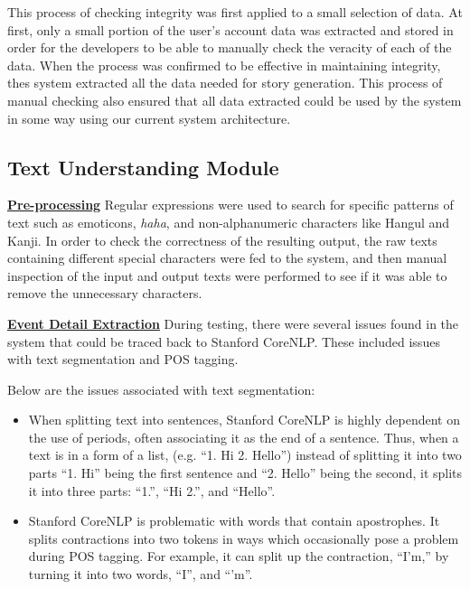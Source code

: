 This process of checking integrity was first applied to a small selection of data. At first, only a small portion of the user's account data was extracted and stored in order for the developers to be able to manually check the veracity of each of the data. When the process was confirmed to be effective in maintaining integrity, thes system extracted all the data needed for story generation. This process of manual checking also ensured that all data extracted could be used by the system in some way using our current system architecture.


\subsection{Text Understanding Module}
\underline{\textbf{Pre-processing}}
Regular expressions were used to search for specific patterns of text such as emoticons, \textit{haha}, and non-alphanumeric characters like Hangul and Kanji. In order to check the correctness of the resulting output, the raw texts containing different special characters were fed to the system, and then manual inspection of the input and output texts were performed to see if it was able to remove the unnecessary characters. 

\underline{\textbf{Event Detail Extraction}}
During testing, there were several issues found in the system that could be traced back to Stanford CoreNLP. These included issues with text segmentation and POS tagging.

Below are the issues associated with text segmentation:
\begin{itemize}
	\item When splitting text into sentences, Stanford CoreNLP is highly dependent on the use of periods, often associating it as the end of a sentence. Thus, when a text is in a form of a list, (e.g. ``1. Hi 2. Hello'') instead of splitting it into two parts ``1. Hi'' being the first sentence and ``2. Hello'' being the second, it splits it into three parts: ``1.'', ``Hi 2.'', and ``Hello''. 
	\item Stanford CoreNLP is problematic with words that contain apostrophes. It splits contractions into two tokens in ways which occasionally pose a problem during POS tagging. For example, it can split up the contraction, ``I'm,'' by turning it into two words, ``I'', and ``'m''.
\end{itemize}

